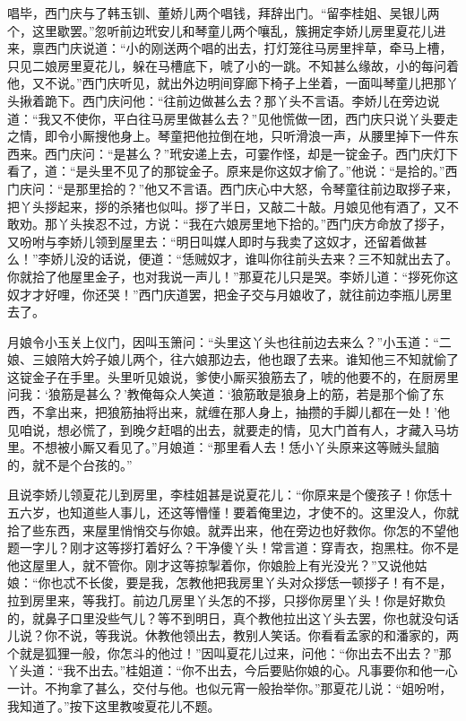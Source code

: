 唱毕，西门庆与了韩玉钏、董娇儿两个唱钱，拜辞出门。“留李桂姐、吴银儿两个，这里歇罢。”忽听前边玳安儿和琴童儿两个嚷乱，簇拥定李娇儿房里夏花儿进来，禀西门庆说道：“小的刚送两个唱的出去，打灯笼往马房里拌草，牵马上槽，只见二娘房里夏花儿，躲在马槽底下，唬了小的一跳。不知甚么缘故，小的每问着他，又不说。”西门庆听见，就出外边明间穿廊下椅子上坐着，一面叫琴童儿把那丫头揪着跪下。西门庆问他：“往前边做甚么去？那丫头不言语。李娇儿在旁边说道：“我又不使你，平白往马房里做甚么去？”见他慌做一团，西门庆只说丫头要走之情，即令小厮搜他身上。琴童把他拉倒在地，只听滑浪一声，从腰里掉下一件东西来。西门庆问：“是甚么？”玳安递上去，可霎作怪，却是一锭金子。西门庆灯下看了，道：“是头里不见了的那锭金子。原来是你这奴才偷了。”他说：“是拾的。”西门庆问：“是那里拾的？”他又不言语。西门庆心中大怒，令琴童往前边取拶子来，把丫头拶起来，拶的杀猪也似叫。拶了半日，又敲二十敲。月娘见他有酒了，又不敢劝。那丫头挨忍不过，方说：“我在六娘房里地下拾的。”西门庆方命放了拶子，又吩咐与李娇儿领到屋里去：“明日叫媒人即时与我卖了这奴才，还留着做甚么！”李娇儿没的话说，便道：“恁贼奴才，谁叫你往前头去来？三不知就出去了。你就拾了他屋里金子，也对我说一声儿！”那夏花儿只是哭。李娇儿道：“拶死你这奴才才好哩，你还哭！”西门庆道罢，把金子交与月娘收了，就往前边李瓶儿房里去了。

月娘令小玉关上仪门，因叫玉箫问：“头里这丫头也往前边去来么？”小玉道：“二娘、三娘陪大妗子娘儿两个，往六娘那边去，他也跟了去来。谁知他三不知就偷了这锭金子在手里。头里听见娘说，爹使小厮买狼筋去了，唬的他要不的，在厨房里问我：‘狼筋是甚么？’教俺每众人笑道：‘狼筋敢是狼身上的筋，若是那个偷了东西，不拿出来，把狼筋抽将出来，就缠在那人身上，抽攒的手脚儿都在一处！’他见咱说，想必慌了，到晚夕赶唱的出去，就要走的情，见大门首有人，才藏入马坊里。不想被小厮又看见了。”月娘道：“那里看人去！恁小丫头原来这等贼头鼠脑的，就不是个台孩的。”

且说李娇儿领夏花儿到房里，李桂姐甚是说夏花儿：“你原来是个傻孩子！你恁十五六岁，也知道些人事儿，还这等懵懂！要着俺里边，才使不的。这里没人，你就拾了些东西，来屋里悄悄交与你娘。就弄出来，他在旁边也好救你。你怎的不望他题一字儿？刚才这等拶打着好么？干净傻丫头！常言道：穿青衣，抱黑柱。你不是他这屋里人，就不管你。刚才这等掠掣着你，你娘脸上有光没光？”又说他姑娘：“你也忒不长俊，要是我，怎教他把我房里丫头对众拶恁一顿拶子！有不是，拉到房里来，等我打。前边几房里丫头怎的不拶，只拶你房里丫头！你是好欺负的，就鼻子口里没些气儿？等不到明日，真个教他拉出这丫头去罢，你也就没句话儿说？你不说，等我说。休教他领出去，教别人笑话。你看看孟家的和潘家的，两个就是狐狸一般，你怎斗的他过！”因叫夏花儿过来，问他：“你出去不出去？”那丫头道：“我不出去。”桂姐道：“你不出去，今后要贴你娘的心。凡事要你和他一心一计。不拘拿了甚么，交付与他。也似元宵一般抬举你。”那夏花儿说：“姐吩咐，我知道了。”按下这里教唆夏花儿不题。

